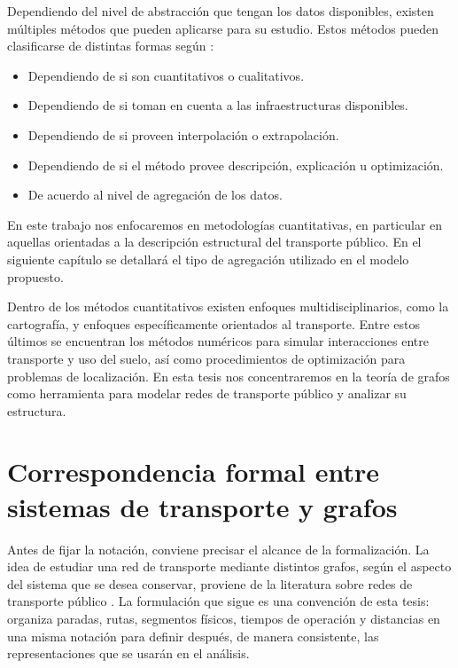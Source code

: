     Dependiendo del nivel de abstracción que tengan los datos disponibles, existen múltiples métodos que pueden aplicarse para su estudio. Estos métodos pueden clasificarse de distintas formas según \cite{rodrigues2020}:
        \begin{itemize}
            \item Dependiendo de si son cuantitativos o cualitativos.
            \item Dependiendo de si toman en cuenta a las infraestructuras disponibles.
            \item Dependiendo de si proveen interpolación o extrapolación.
            \item Dependiendo de si el método provee descripción, explicación u optimización.
            \item De acuerdo al nivel de agregación de los datos.
        \end{itemize}

    En este trabajo nos enfocaremos en metodologías cuantitativas, en particular en aquellas orientadas a la descripción estructural del transporte público. En el siguiente capítulo se detallará el tipo de agregación utilizado en el modelo propuesto.

    Dentro de los métodos cuantitativos existen enfoques multidisciplinarios, como la cartografía, y enfoques específicamente orientados al transporte. Entre estos últimos se encuentran los métodos numéricos para simular interacciones entre transporte y uso del suelo, así como procedimientos de optimización para problemas de localización. En esta tesis nos concentraremos en la teoría de grafos como herramienta para modelar redes de transporte público y analizar su estructura.

    \section{Correspondencia formal entre sistemas de transporte y grafos}

    Antes de fijar la notación, conviene precisar el alcance de la formalización. La idea de estudiar una red de transporte mediante distintos grafos, según el aspecto del sistema que se desea conservar, proviene de la literatura sobre redes de transporte público \cite{vanferber2009, dingluo2019}. La formulación que sigue es una convención de esta tesis: organiza paradas, rutas, segmentos físicos, tiempos de operación y distancias en una misma notación para definir después, de manera consistente, las representaciones que se usarán en el análisis.

